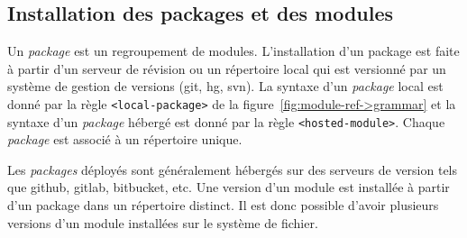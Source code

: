 \subsection{Installation des packages et des modules}
%
Un \textit{package} est un regroupement de modules.  L'installation d'un
package est faite à partir d'un serveur de révision ou un répertoire local qui
est versionné par un système de gestion de versions (git, hg, svn).  La syntaxe
d'un \textit{package} local est donné par la règle \texttt{<local-package>} de
la figure~\ref{fig:module-ref->grammar} et la syntaxe d'un \textit{package}
hébergé est donné par la règle \texttt{<hosted-module>}.  Chaque
\textit{package} est associé à un répertoire unique.







Les \textit{packages} déployés sont généralement hébergés sur des serveurs de
version tels que github, gitlab, bitbucket, etc. Une version d'un module est
installée à partir d'un package dans un répertoire distinct.
Il est donc possible d'avoir plusieurs versions d'un module installées
sur le système de fichier.

